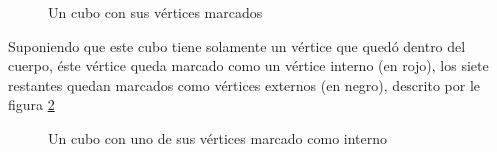 \begin{figure}[hbp]
\centering
\caption{Un cubo con sus vértices marcados}
\label{f:estadoDelArte:cube_01}
\end{figure}

Suponiendo que este cubo tiene solamente un vértice que quedó dentro del cuerpo, éste 
vértice queda marcado como un vértice interno (en rojo), los siete restantes quedan marcados 
como vértices externos (en negro), descrito por le figura \ref{f:estadoDelArte:cube_02}

\begin{figure}[hbp]
\centering
\caption{Un cubo con uno de sus vértices marcado como interno}
\label{f:estadoDelArte:cube_02}
\end{figure}

